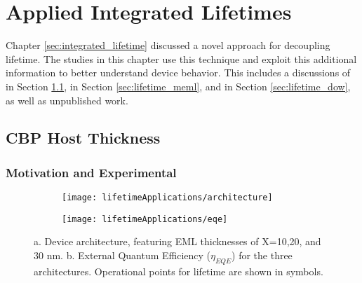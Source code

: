 \documentclass[../thesis.tex]{subfiles}
\begin{document}
\chapter{Applied Integrated Lifetimes}\label{sec:decoupling_applications}

Chapter \ref{sec:integrated_lifetime} discussed a novel approach for decoupling lifetime.  
The studies in this chapter use this technique and exploit this additional information to better understand device behavior.
This includes a discussions of \textcite{Hershey2017} in Section \ref{sec:cbp_host}, \textcite{Bangsund2018} in Section \ref{sec:lifetime_meml}, and \textcite{Bangsund2018a} in Section \ref{sec:lifetime_dow}, as well as unpublished work.


\section{CBP Host Thickness}\label{sec:cbp_host}

\subsection{Motivation and Experimental}

\begin{figure}[ht]
\centering
\begin{subfigure}{.2\textheight}
\texttt{[image: lifetimeApplications/architecture]}
\caption{}
\label{fig:cbp_architecture}
\end{subfigure}
\begin{subfigure}{.2\textheight}
\texttt{[image: lifetimeApplications/eqe]}
\caption{}
\label{fig:cbp_eqe}
\end{subfigure}
\caption{a. Device architecture, featuring EML thicknesses of X=10,20, and 30 nm.  b. External Quantum Efficiency ($\eta_{EQE}$) for the three architectures.  Operational points for lifetime are shown in symbols.}
\end{figure}
\end{document}
